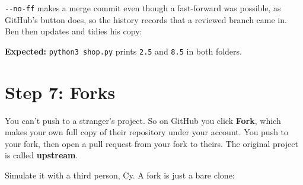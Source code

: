 
\texttt{-\/-no-ff} makes a merge commit even though a fast-forward was possible, as GitHub's button does, so the history records that a reviewed branch came in. Ben then updates and tidies his copy:

\begin{codeblock}

\begin{Shaded}
\begin{Highlighting}[]
\end{Highlighting}
\end{Shaded}

\end{codeblock}

\textbf{Expected:} \texttt{python3\ shop.py} prints \texttt{2.5} and \texttt{8.5} in both folders.

\section{Step 7: Forks}\label{11-lab-work-on-a-project-with-someone-else:step-7-forks}

You can't push to a stranger's project. So on GitHub you click \textbf{Fork}, which makes your own full copy of their repository under your account. You push to your fork, then open a pull request from your fork to theirs. The original project is called \textbf{upstream}.


Simulate it with a third person, Cy. A fork is just a bare clone:

\begin{codeblock}

\begin{Shaded}
\begin{Highlighting}[]
\end{Highlighting}
\end{Shaded}

\end{codeblock}

